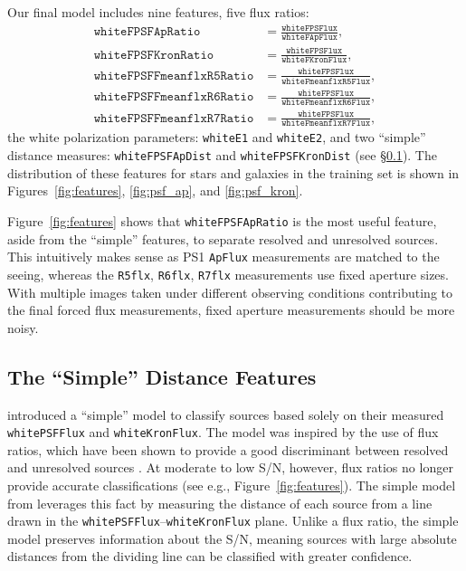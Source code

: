 \documentclass[twocolumn]{aastex63}
\begin{document}
Our final model includes nine features, five flux ratios:
%
\begin{align*}
    \mathtt{whiteFPSFApRatio} &= \frac{\mathtt{whiteFPSFlux}}{\mathtt{whiteFApFlux}},\\
    \mathtt{whiteFPSFKronRatio} &= \frac{\mathtt{whiteFPSFlux}}{\mathtt{whiteFKronFlux}},\\
    \mathtt{whiteFPSFFmeanflxR5Ratio} &= \frac{\mathtt{whiteFPSFlux}}{\mathtt{whiteFmeanflxR5Flux}},\\
    \mathtt{whiteFPSFFmeanflxR6Ratio} &= \frac{\mathtt{whiteFPSFlux}}{\mathtt{whiteFmeanflxR6Flux}},\\
    \mathtt{whiteFPSFFmeanflxR7Ratio} &= \frac{\mathtt{whiteFPSFlux}}{\mathtt{whiteFmeanflxR7Flux}},
\end{align*}
%
the white polarization parameters: \texttt{whiteE1} and \texttt{whiteE2}, and
two ``simple'' distance measures: \texttt{whiteFPSFApDist} and
\texttt{whiteFPSFKronDist} (see \S\ref{sec:simple_model}). The distribution of
these features for stars and galaxies in the training set is shown in
Figures~\ref{fig:features}, \ref{fig:psf_ap}, and \ref{fig:psf_kron}.

Figure~\ref{fig:features} shows that \texttt{whiteFPSFApRatio} is the most
useful feature, aside from the ``simple'' features, to separate resolved and
unresolved sources. This intuitively makes sense as PS1 \texttt{ApFlux}
measurements are matched to the seeing, whereas the \texttt{R5flx},
\texttt{R6flx}, \texttt{R7flx} measurements use fixed aperture sizes. With
multiple images taken under different observing conditions contributing to the
final forced flux measurements, fixed aperture measurements should be more
noisy.

\subsection{The ``Simple'' Distance Features}\label{sec:simple_model}

\citet{Tachibana18} introduced a ``simple'' model to classify sources based
solely on their measured \texttt{whitePSFFlux} and \texttt{whiteKronFlux}. The
model was inspired by the use of flux ratios, which have been shown to provide
a good discriminant between resolved and unresolved sources \citep[e.g., the
SDSS morphological \texttt{CLASS} parameter;][]{Lupton01}. At moderate to low
S/N, however, flux ratios no longer provide accurate classifications (see
e.g., Figure~\ref{fig:features}). The simple model from \citet{Tachibana18}
leverages this fact by measuring the distance of each source from a line drawn
in the \texttt{whitePSFFlux}--\texttt{whiteKronFlux} plane. Unlike a flux
ratio, the simple model preserves information about the S/N, meaning sources
with large absolute distances from the dividing line can be classified with
greater confidence.
\end{document}
